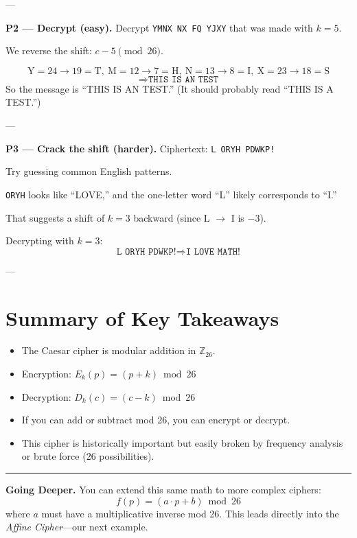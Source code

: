 \documentclass[12pt]{article}
\begin{document}
---

\textbf{P2 — Decrypt (easy).}  
Decrypt \texttt{YMNX NX FQ YJXY} that was made with $k=5$.

We reverse the shift: $c - 5 \pmod{26}$.

\[
\text{Y}=24\to19=\text{T},\ \text{M}=12\to7=\text{H},\ \text{N}=13\to8=\text{I},\ \text{X}=23\to18=\text{S}
\]
\[
\Rightarrow \boxed{\texttt{THIS IS AN TEST}}
\]
So the message is “THIS IS AN TEST.” (It should probably read “THIS IS A TEST.”)

---

\textbf{P3 — Crack the shift (harder).}  
Ciphertext: \texttt{L ORYH PDWKP!}

Try guessing common English patterns.

\texttt{ORYH} looks like “LOVE,” and the one-letter word “L” likely corresponds to “I.”

That suggests a shift of $k=3$ backward (since L $\to$ I is $-3$).

Decrypting with $k=3$:
\[
\texttt{L ORYH PDWKP!} \Rightarrow \boxed{\texttt{I LOVE MATH!}}
\]

---

\section*{Summary of Key Takeaways}
\begin{itemize}
  \item The Caesar cipher is modular addition in $\mathbb{Z}_{26}$.
  \item Encryption: $E_k(p) = (p + k) \bmod 26$
  \item Decryption: $D_k(c) = (c - k) \bmod 26$
  \item If you can add or subtract mod 26, you can encrypt or decrypt.
  \item This cipher is historically important but easily broken by frequency analysis or brute force (26 possibilities).
\end{itemize}

\hrule
\bigskip

\textbf{Going Deeper.}  
You can extend this same math to more complex ciphers:
\[
f(p) = (a\cdot p + b)\bmod 26
\]
where $a$ must have a multiplicative inverse mod 26. This leads directly into the \emph{Affine Cipher}—our next example.
\end{document}
